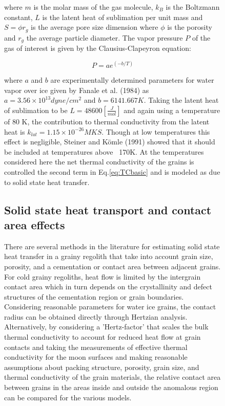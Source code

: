 \documentclass[11pt]{article} %
\begin{document}
\begin{figure}[ht]
	where $m$ is the molar mass of the gas molecule, $k_{B}$ is the Boltzmann constant, $L$ is the latent heat of sublimation per unit mass and $S = \phi r_{g}$ is the average pore size dimension where $\phi$ is the porosity and $r_{g}$ the average particle diameter. The vapor pressure $P$ of the gas of interest is given by the Clausius-Clapeyron equation:
	 
	 \begin{equation} \label{eq:CCpres}
	 P = ae^{(-b/T)}
	 \end{equation}
	 
	 where $a$ and $b$ are experimentally determined parameters for water vapor over ice given by Fanale et al. (1984) as $a = 3.56 \times 10^{13} dyne/cm^{2}$ and $b = 6141.667 K$. Taking the latent heat of sublimation to be $L = 48600 [\frac{J}{mol}]$ and again using a temperature of 80 K, the contribution to thermal conductivity from the latent heat is $k_{lat} = 1.15\times10^{-26} MKS$. Though at low temperatures this effect is negligible, Steiner and K\"{o}mle (1991) showed that it should be included at temperatures above ~170K. At the temperatures considered here the net thermal conductivity of the grains is controlled the second term in Eq.\ref{eq:TCbasic} and is modeled as due to solid state heat transfer.

\subsection{Solid state heat transport and contact area effects}
	There are several methods in the literature for estimating solid state heat transfer in a grainy regolith that take into account grain size, porosity, and a cementation or contact area between adjacent grains. For cold grainy regoliths, heat flow is limited by the intergrain contact area which in turn depends on the crystallinity and defect structures of the cementation region or grain boundaries. Considering reasonable parameters for water ice grains, the contact radius can be obtained directly through Hertzian analysis. Alternatively, by considering a 'Hertz-factor' that scales the bulk thermal conductivity to account for reduced heat flow at grain contacts and taking the measurements of effective thermal conductivity for the moon surfaces and making reasonable assumptions about packing structure, porosity, grain size, and thermal conductivity of the grain materials, the relative contact area between grains in the areas inside and outside the anomalous region can be compared for the various models. 
	

\end{figure}
\end{document}
